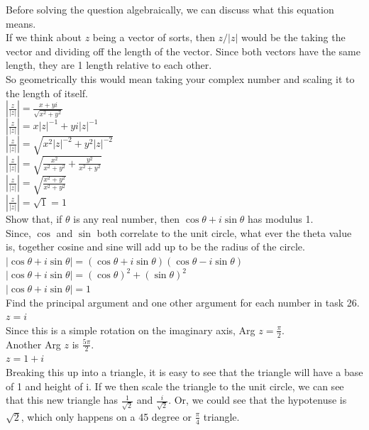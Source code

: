 \documentclass[12pt]{article}
\begin{document}
Before solving the question algebraically, we can discuss what this equation means.\\
If we think about $z$ being a vector of sorts, then $z/|z|$ would be the taking the vector and dividing off the length of the vector. 
Since both vectors have the same length, they are 1 length relative to each other.\\
So geometrically this would mean taking your complex number and scaling it to the length of itself.\\

$|\frac{z}{|z|}| = \frac{x+yi}{\sqrt{x^2 + y^2}}$\\
$|\frac{z}{|z|}| = x|z|^{-1} + yi|z|^{-1}$\\
$|\frac{z}{|z|}| = \sqrt{x^2|z|^{-2} + y^2|z|^{-2}}$\\
$|\frac{z}{|z|}| = \sqrt{\frac{x^2}{x^2 + y^2} + \frac{y^2}{x^2 + y^2}}$\\
$|\frac{z}{|z|}| = \sqrt{\frac{x^2 + y^2}{x^2 + y^2}}$\\
$|\frac{z}{|z|}| = \sqrt{1} = 1$\\



 Show that, if $\theta$ is any real number, then $\cos\theta + i\sin\theta$ has modulus 1.\\

Since, $\cos$ and $\sin$ both correlate to the unit circle, what ever the theta value is, together cosine and sine will add up to be the radius of the circle.\\


$|\cos\theta + i\sin\theta| = (\cos\theta + i\sin\theta)(\cos\theta - i\sin\theta)$\\
$|\cos\theta + i\sin\theta| = (\cos\theta)^2 + (\sin\theta)^2$\\
$|\cos\theta + i\sin\theta| = 1$\\


 Find the principal argument and one other argument for each number in task 26.\\

 $z = i$\\
Since this is a simple rotation on the imaginary axis, Arg $z = \frac{\pi}{2}$.\\ 
Another Arg $z$ is $\frac{5\pi}{2}$.\\

 $z = 1 + i$\\
Breaking this up into a triangle, it is easy to see that the triangle will have a base of 1 and height of i. 
If we then scale the triangle to the unit circle, we can see that this new triangle has $\frac{1}{\sqrt{2}}$ and $\frac{i}{\sqrt{2}}$.
Or, we could see that the hypotenuse is $\sqrt{2}$, which only happens on a 45 degree or $\frac{\pi}{4}$ triangle.\\
\end{document}

